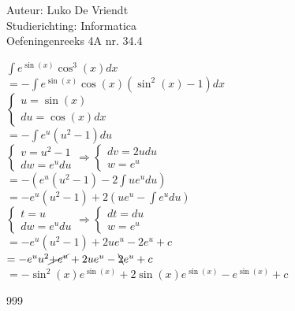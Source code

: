 \documentclass[a4paper]{article}
\begin{document}
\noindent \large Auteur: Luko De Vriendt\\
\noindent \large Studierichting: Informatica\\
\noindent \large Oefeningenreeks 4A nr. 34.4\\

\medskip

\normalsize

$\displaystyle \int e^{\sin (x)} \cos^3 (x)dx$ \\

$= -\displaystyle \int e^{\sin (x)} \cos (x) (\sin^2 (x) -1)dx$ \\

$\left \{
\begin{array}{l}
     u = \sin (x) \\
     du = \cos (x)dx
\end{array}
\right .$ \\

$= -\displaystyle \int e^u(u^2 - 1)du$ \\

$\left \{
\begin{array}{l}
     v = u^2 - 1\\
     dw = e^udu
\end{array}
\right .
\Rightarrow
\left \{
\begin{array}{l}
     dv = 2udu \\
     w = e^u
\end{array}
\right .$ \\

$= -\left ( e^u(u^2 - 1) - 2\displaystyle \int ue^u du \right)$ \\

$= -e^u(u^2 - 1) + 2\left( ue^u - \displaystyle \int e^u du\right)$ \\

$\left \{
\begin{array}{l}
     t = u \\
     dw = e^udu
\end{array}
\right .
\Rightarrow
\left \{
\begin{array}{l}
     dt = du \\
     w = e^u
\end{array}
\right .$ \\

$= -e^u(u^2 - 1) + 2ue^u -2e^u + c$ \\

$= -e^uu^2 \cancel{+ e^u} + 2ue^u - \bcancel{2} e^u + c$ \\

$= -\sin^2 (x)e^{\sin(x)} + 2\sin (x)e^{\sin (x)} - e^{\sin (x)} + c$ \\

\begin{thebibliography}{999}
\end{thebibliography}
\end{document}
